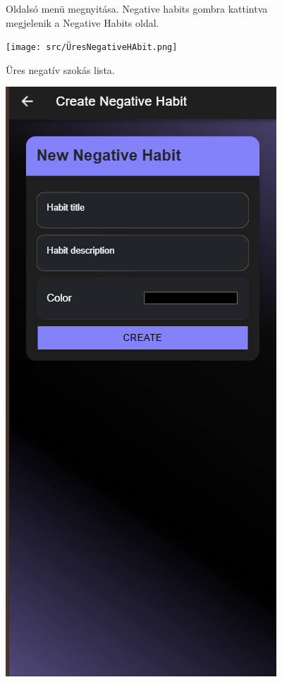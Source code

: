 \documentclass[12pt]{report}
\begin{document}
\begin{figure}[H]
\begin{minipage}[b]{0.2\textwidth}
        \par
        \footnotesize Oldalsó menü megnyitása. Negative habits gombra kattintva megjelenik a Negative Habits oldal.
    \end{minipage}
    \hfill
    \begin{minipage}[b]{0.2\textwidth}
        \centering
        \texttt{[image: src/ÜresNegativeHAbit.png]}
        \par
        \footnotesize Üres negatív szokás lista.
    \end{minipage}
    \hfill
    \begin{minipage}[b]{0.2\textwidth}
        \centering
        \includegraphics[width=\linewidth]{src/NegativeHozzaad.png}

\end{minipage}
\end{figure}
\end{document}
